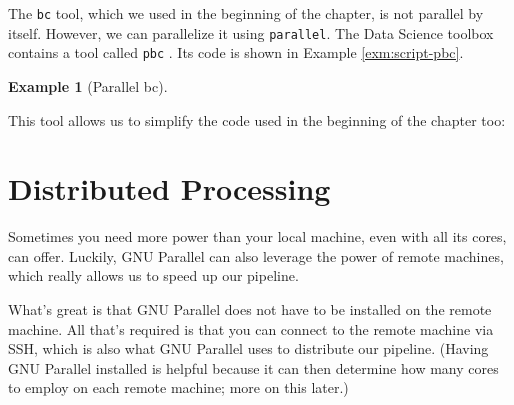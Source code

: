 \documentclass[
]{book}
\newenvironment{Shaded}{\begin{snugshade}}{\end{snugshade}}
\newcommand{\CommentTok}[1]{\textcolor[rgb]{0.56,0.35,0.01}{\textit{#1}}}
\newcommand{\ExtensionTok}[1]{#1}
\newcommand{\FunctionTok}[1]{\textcolor[rgb]{0.00,0.00,0.00}{#1}}
\newcommand{\KeywordTok}[1]{\textcolor[rgb]{0.13,0.29,0.53}{\textbf{#1}}}
\newcommand{\NormalTok}[1]{#1}
\newcommand{\StringTok}[1]{\textcolor[rgb]{0.31,0.60,0.02}{#1}}
\newcommand{\VariableTok}[1]{\textcolor[rgb]{0.00,0.00,0.00}{#1}}
\theoremstyle{definition}
\theoremstyle{definition}
\newtheorem{example}{Example}[chapter]
\theoremstyle{definition}
\theoremstyle{remark}
\begin{document}
The \texttt{bc} tool, which we used in the beginning of the chapter, is not parallel by itself. However, we can parallelize it using \texttt{parallel}. The Data Science toolbox contains a tool called \texttt{pbc} \citep{pbc}. Its code is shown in Example \ref{exm:script-pbc}.

\begin{example}[Parallel bc]
\protect\hypertarget{exm:script-pbc}{}{\label{exm:script-pbc} {} }
\end{example}

\begin{Shaded}
\end{Shaded}

This tool allows us to simplify the code used in the beginning of the chapter too:

\begin{Shaded}
\end{Shaded}

\hypertarget{distributed-processing}{%
\section{Distributed Processing}\label{distributed-processing}}

Sometimes you need more power than your local machine, even with all its cores, can offer. Luckily, GNU Parallel can also leverage the power of remote machines, which really allows us to speed up our pipeline.

What's great is that GNU Parallel does not have to be installed on the remote machine. All that's required is that you can connect to the remote machine via SSH, which is also what GNU Parallel uses to distribute our pipeline. (Having GNU Parallel installed is helpful because it can then determine how many cores to employ on each remote machine; more on this later.)
\end{document}

